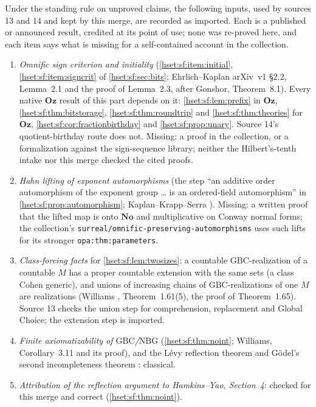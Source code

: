 \documentclass[11pt,letterpaper]{article}
\theoremstyle{definition}
\theoremstyle{remark}
\newcommand{\No}{\mathbf{No}}
\newcommand{\lbl}[1]{\nolinkurl{#1}}
\newcommand{\repo}[1]{\nolinkurl{#1}}
\newcommand{\Oz}{\mathbf{Oz}}
\newcommand{\GBC}{\mathrm{GBC}}
\newcommand{\NBG}{\mathrm{NBG}}
\begin{document}
Under the standing rule on unproved claims, the following inputs, used by sources 13
and 14 and kept by this merge, are recorded as imported. Each is a published or
announced result, credited at its point of use; none was re-proved here, and each
item says what is missing for a self-contained account in the collection.
\begin{enumerate}[label=(\arabic*)]
\item \emph{Omnific sign criterion and initiality} (\ref{hset:sf:item:initial},
\ref{hset:sf:item:signcrit} of \cref{hset:sf:sec:bits}; Ehrlich--Kaplan arXiv~v1
\S2.2, Lemma~2.1 and the proof of Lemma~2.3, after Gonshor, Theorem~8.1). Every native
$\Oz$ result of this part depends on it: \cref{hset:sf:lem:prefix} in $\Oz$,
\cref{hset:sf:thm:bitstorage}, \cref{hset:sf:thm:roundtrip} and
\cref{hset:sf:thm:theories} for $\Oz$, \cref{hset:sf:cor:fractionbirthday} and
\cref{hset:sf:prop:unary}. Source 14's quotient-birthday route does not. Missing: a
proof in the collection, or a formalization against the sign-sequence library;
neither the Hilbert's-tenth intake nor this merge checked the cited proofs.
\item \emph{Hahn lifting of exponent automorphisms} (the step ``an additive order
automorphism of the exponent group \dots{} is an ordered-field automorphism'' in
\cref{hset:sf:prop:automorphism}; Kaplan--Krapp--Serra \cite{KKS}). Missing: a
written proof that the lifted map is onto $\No$ and multiplicative on Conway normal
forms; the collection's \repo{surreal/omnific-preserving-automorphisms} uses such
lifts for its stronger \lbl{opa:thm:parameters}.
\item \emph{Class-forcing facts} for \cref{hset:sf:lem:twosizes}: a countable
$\GBC$-realization of a countable $M$ has a proper countable extension with the same
sets (a class Cohen generic), and unions of increasing chains of
$\GBC$-realizations of one $M$ are realizations (Williams \cite{WilliamsDiss},
Theorem~1.61(5), the proof of Theorem~1.65). Source 13 checks the union step for
comprehension, replacement and Global Choice; the extension step is imported.
\item \emph{Finite axiomatizability of $\GBC$/$\NBG$} (\cref{hset:sf:thm:noint};
Williams, Corollary~3.11 and its proof), and the L\'evy reflection theorem and
G\"odel's second incompleteness theorem \cite{Levy,Godel}: classical.
\item \emph{Attribution of the reflection argument to Hamkins--Yao, Section~4}: checked
for this merge and correct (\cref{hset:sf:thm:noint}).

\end{enumerate}
\end{document}
